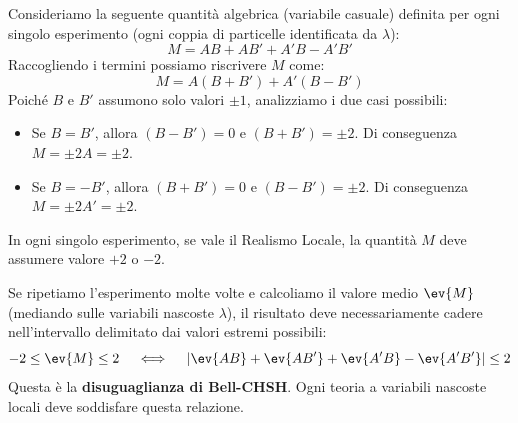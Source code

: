 Consideriamo la seguente quantità algebrica (variabile casuale) definita per ogni singolo esperimento (ogni coppia di particelle identificata da $\lambda$):
\[
    M = AB + AB' + A'B - A'B'
\]
Raccogliendo i termini possiamo riscrivere $M$ come:
\[
    M = A(B + B') + A'(B - B')
\]
Poiché $B$ e $B'$ assumono solo valori $\pm 1$, analizziamo i due casi possibili:
\begin{itemize}
    \item Se $B = B'$, allora $(B-B')=0$ e $(B+B')=\pm 2$. Di conseguenza $M = \pm 2 A = \pm 2$.
    \item Se $B = -B'$, allora $(B+B')=0$ e $(B-B')=\pm 2$. Di conseguenza $M = \pm 2 A' = \pm 2$.
\end{itemize}
In ogni singolo esperimento, se vale il Realismo Locale, la quantità $M$ deve assumere valore $+2$ o $-2$.

Se ripetiamo l'esperimento molte volte e calcoliamo il valore medio $\ev{M}$ (mediando sulle variabili nascoste $\lambda$), il risultato deve necessariamente cadere nell'intervallo delimitato dai valori estremi possibili:
\begin{equation} \label{eq:bell_inequality}
    -2 \leq \ev{M} \leq 2 \quad \iff \quad |\ev{AB} + \ev{AB'} + \ev{A'B} - \ev{A'B'}| \leq 2
\end{equation}
Questa è la \textbf{disuguaglianza di Bell-CHSH}. Ogni teoria a variabili nascoste locali deve soddisfare questa relazione.

